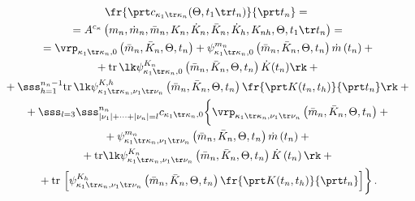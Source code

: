 \begin{multline}

\fr{\prt c_{\kappa_1 \tr \kappa_n} (\Theta, t_1\tr t_n)}{\prt t_n} = {}\\

{}=

{A}^{c_\kappa} \left(m_n, \dot m_n, \bar m_n, K_n, \dot K_n, \bar K_n, 

\dot K_h, K_{nh}, \Theta, t_1\tr t_n\right) ={}\\

{}= \vrp_{\kappa_1\tr \kappa_n, 0} \left(\bar m_n, \bar K_n, \Theta, t_n\right)+ 

\psi_{\kappa_1 \tr \kappa_n, 0}^{m_n}\left(\bar m_n, \bar K_n, \Theta, t_n\right)\dot m\left(t_n\right) 

+{}\\

{}+\mathrm{tr}\, \lk \psi_{\kappa_1\tr \kappa_n, 0}^{K_n} 

\left(\bar m_n, \bar K_n, \Theta, t_n\right) \dot K (t_n)\rk +{}\\

{}+\sss_{h=1}^{n_n-1} \mathrm{tr}\, \lk \psi_{\kappa_1\tr \kappa_n, \nu_1\tr 

\nu_n}^{K,h} \left(\bar m_n, \bar K_n, \Theta, t_n\right) 

\fr{\prt K(t_n, t_h)}{\prt t_n}\rk +{}\\

{}+\sss_{l=3}\sss_{|\nu_1 | +\cdots + |\nu_n |=l}^{n_n} c_{\kappa_1 \tr \kappa_n, 0} 

\biggl\{ \vrp_{\kappa_1\tr \kappa_n, \nu_1\tr \nu_n} 

\left(\bar m_n, \bar K_n, \Theta, t_n\right)+{}\\

{}+ \psi_{\kappa_1\tr \kappa_n, \nu_1\tr \nu_n}^{m_n} 

\left(\bar m_n, \bar K_n, \Theta, t_n\right)\dot m \left(t_n\right) +{}\\

{}+

\mathrm{tr} \lk \psi_{\kappa_1\tr \kappa_n,\nu_1\tr \nu_n}^{K_n} 

\left(\bar m_n, \bar K_n, \Theta, t_n\right) \dot K \left(t_n\right)\rk+{}\\

{}+\mathrm{tr}\, \left[ \psi_{\kappa_1\tr \kappa_n, \nu_1\tr \nu_n}^{K_h} 

\left(\bar m_n, \bar K_n, \Theta, t_n\right)

\fr{\prt K(t_n, t_h)}{\prt t_n}\right] \biggr\}\,.\label{e6.7-s2}

\end{multline}

